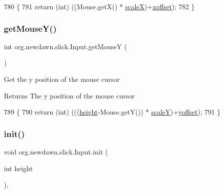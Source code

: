 \begin{DoxyCode}
780                            \{
781         \textcolor{keywordflow}{return} (\textcolor{keywordtype}{int}) ((Mouse.getX() * \mbox{\hyperlink{classorg_1_1newdawn_1_1slick_1_1_input_ad007c0ee133e9e1ca57f2ae95c7df166}{scaleX}})+\mbox{\hyperlink{classorg_1_1newdawn_1_1slick_1_1_input_a51d996d444321f25398b39993bbe9dd2}{xoffset}});
782     \}
\end{DoxyCode}
\mbox{\label{classorg_1_1newdawn_1_1slick_1_1_input_abf405c2d30fa7ede5a8d8619c6737a76}} 
\subsubsection{\texorpdfstring{get\+Mouse\+Y()}{getMouseY()}}
{\footnotesize\ttfamily int org.\+newdawn.\+slick.\+Input.\+get\+MouseY (\begin{DoxyParamCaption}{ }\end{DoxyParamCaption})\hspace{0.3cm}{\ttfamily [inline]}}

Get the y position of the mouse cursor

\begin{DoxyReturn}{Returns}
The y position of the mouse cursor 
\end{DoxyReturn}

\begin{DoxyCode}
789                            \{
790         \textcolor{keywordflow}{return} (\textcolor{keywordtype}{int}) (((\mbox{\hyperlink{classorg_1_1newdawn_1_1slick_1_1_input_a7d805ec6ad6944a4c48189e8435c3589}{height}}-Mouse.getY()) * \mbox{\hyperlink{classorg_1_1newdawn_1_1slick_1_1_input_a1a1f2fde64f0947353a3b1c2ea09d42c}{scaleY}})+\mbox{\hyperlink{classorg_1_1newdawn_1_1slick_1_1_input_a83f7e89a50859707a59db3464a2d98a8}{yoffset}});
791     \}
\end{DoxyCode}
\mbox{\label{classorg_1_1newdawn_1_1slick_1_1_input_a793fc05d5ffdf793eac37e6577bace4c}} 
\subsubsection{\texorpdfstring{init()}{init()}}
{\footnotesize\ttfamily void org.\+newdawn.\+slick.\+Input.\+init (\begin{DoxyParamCaption}\item[{int}]{height }\end{DoxyParamCaption})\hspace{0.3cm}{\ttfamily [inline]}, {\ttfamily [package]}}

